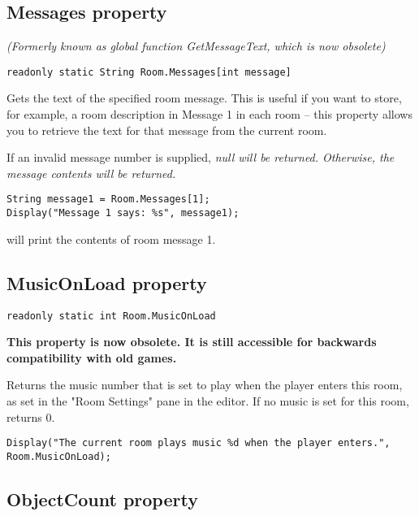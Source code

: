 \subsection{Messages property}\label{Room.Messages}%

\it{(Formerly known as global function GetMessageText, which is now obsolete)}

\begin{verbatim}
readonly static String Room.Messages[int message]
\end{verbatim}
Gets the text of the specified room message. This is useful if you want to store,
for example, a room description in Message 1 in each room -- this property allows
you to retrieve the text for that message from the current room.

If an invalid message number is supplied, \it{null} will be returned. Otherwise, the
message contents will be returned.

\begin{verbatim}
String message1 = Room.Messages[1];
Display("Message 1 says: %s", message1);
\end{verbatim}
will print the contents of room message 1.


\subsection{MusicOnLoad property}\label{Room.MusicOnLoad}%

\begin{verbatim}
readonly static int Room.MusicOnLoad
\end{verbatim}
\bf{This property is now obsolete.} It is still accessible for backwards compatibility
with old games.

Returns the music number that is set to play when the player enters this room, as
set in the "Room Settings" pane in the editor. If no music is set for this room,
returns 0.

\begin{verbatim}
Display("The current room plays music %d when the player enters.", Room.MusicOnLoad);
\end{verbatim}


\subsection{ObjectCount property}\label{Room.ObjectCount}%

